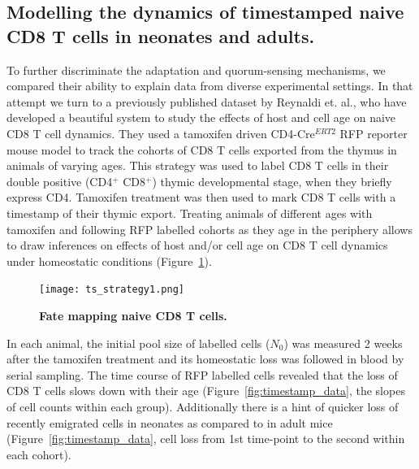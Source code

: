 \documentclass[12pt]{article} %
\begin{document}
\pagestyle{empty}

\setlength{\parskip}{1.5mm}


\subsection*{Modelling the dynamics of timestamped naive CD8 T cells in neonates and adults.}
\vspace{0.2cm}

To further discriminate the adaptation and quorum-sensing mechanisms, we compared their ability to explain data from diverse experimental settings. 
In that attempt we turn to a previously published dataset by Reynaldi et. al., who have developed a beautiful system to study the effects of host and cell age on naive CD8 T cell dynamics.
They used a tamoxifen driven CD4-Cre$^{ERT2}$ RFP reporter mouse model to track the cohorts of CD8 T cells exported from the thymus in animals of varying ages.
This strategy was used to label CD8 T cells in their double positive (CD4$^{+}$ CD8$^{+}$) thymic developmental stage, when they briefly express CD4.
Tamoxifen treatment was then used to mark CD8 T cells with a timestamp of their thymic export.
Treating animals of different ages with tamoxifen and following RFP labelled cohorts as they age in the periphery allows to draw inferences on effects of host and/or cell age on CD8 T cell dynamics under homeostatic conditions (Figure~\ref{fig:timestamp_strategy}).

\begin{figure}[htbp]
\centering
      \texttt{[image: ts\_strategy1.png]}
      \caption{\textbf{Fate mapping naive CD8 T cells.}}
   \label{fig:timestamp_strategy}
 \end{figure}

In each animal, the initial pool size of labelled cells ($N_{0}$) was measured 2 weeks after the tamoxifen treatment and its homeostatic loss was followed in blood by serial sampling.
The time course of RFP labelled cells revealed that the loss of CD8 T cells slows down with their age (Figure~\ref{fig:timestamp_data}, the slopes of cell counts within each group). %
Additionally there is a hint of quicker loss of recently emigrated cells in neonates as compared to in adult mice (Figure~\ref{fig:timestamp_data}, cell loss from 1st time-point to the second within each cohort).
\end{document}
